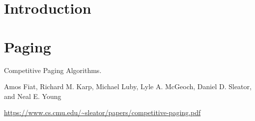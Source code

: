 \section{Introduction}




\section{Paging}

Competitive Paging Algorithms.

Amos Fiat, Richard M. Karp, Michael Luby, Lyle A. McGeoch, Daniel D. Sleator, and Neal E. Young

\url{https://www.cs.cmu.edu/~sleator/papers/competitive-paging.pdf}